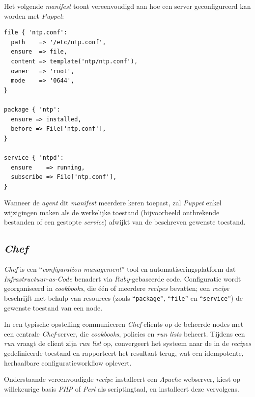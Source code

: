 Het volgende \emph{manifest} toont vereenvoudigd aan hoe een server geconfigureerd kan worden met \emph{Puppet}:

\begin{codeblock}
  \begin{verbatim}
file { 'ntp.conf':
  path    => '/etc/ntp.conf',
  ensure  => file,
  content => template('ntp/ntp.conf'),
  owner   => 'root',
  mode    => '0644',
}

package { 'ntp':
  ensure => installed,
  before => File['ntp.conf'],
}

service { 'ntpd':
  ensure    => running,
  subscribe => File['ntp.conf'],
}
\end{verbatim}
  \caption[Eenvoudig \emph{Puppet}-\emph{manifest} voor een webserver]{\autocite{Perforce2026}}
  \label{code:puppetvb}
\end{codeblock}

Wanneer de \emph{agent} dit \emph{manifest} meerdere keren toepast, zal \emph{Puppet} enkel wijzigingen maken als de werkelijke toestand (bijvoorbeeld ontbrekende bestanden of een gestopte \emph{service}) afwijkt van de beschreven gewenste toestand.

\subsection{\emph{Chef}}%

\emph{Chef} is een ``\emph{configuration management}''-tool en automatiseringsplatform dat \emph{Infrastructuur-as-Code} benadert via \emph{Ruby}-gebaseerde code.
Configuratie wordt georganiseerd in \emph{cookbooks}, die één of meerdere \emph{recipes} bevatten; een \emph{recipe} beschrijft met behulp van resources (zoals ``\texttt{package}'', ``\texttt{file}'' en ``\texttt{service}'') de gewenste toestand van een node.  \autocite{ProgressSoftware2026}

In een typische opstelling communiceren \emph{Chef}-clients op de beheerde nodes met een centrale \emph{Chef}-server, die \emph{cookbooks}, policies en \emph{run lists} beheert.
Tijdens een \emph{run} vraagt de client zijn \emph{run list} op, convergeert het systeem naar de in de \emph{recipes} gedefinieerde toestand en rapporteert het resultaat terug, wat een idempotente, herhaalbare configuratieworkflow oplevert. \autocite{ProgressSoftware2026a}

Onderstaande vereenvoudigde \emph{recipe} installeert een \emph{Apache} webserver, kiest op willekeurige basis \emph{PHP} of \emph{Perl} als scriptingtaal, en installeert deze vervolgens.

